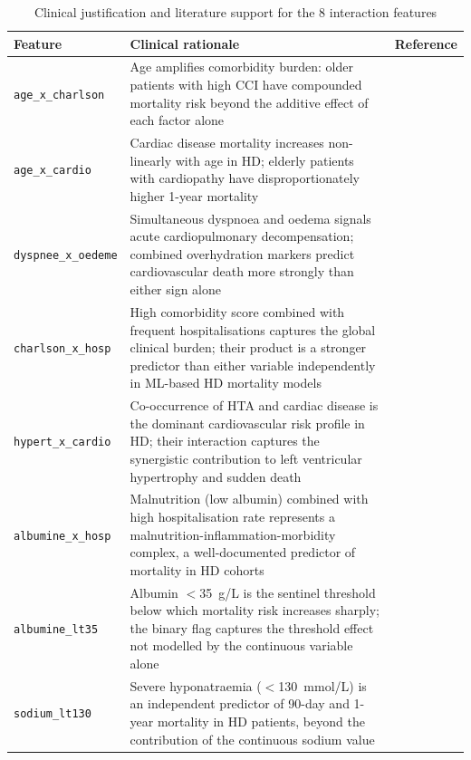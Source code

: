 \documentclass[12pt,a4paper,twoside]{report}
\begin{document}
\begin{table}[htbp]
\centering
\caption{Clinical justification and literature support for the 8 interaction features}
\label{tab:interaction_evidence}
\small\begin{tabularx}{\textwidth}{@{}p{3.6cm}p{5.8cm}p{3.6cm}@{}}
\toprule
\textbf{Feature} & \textbf{Clinical rationale} & \textbf{Reference} \\
\midrule

\texttt{age\_x\_charlson} &
  Age amplifies comorbidity burden: older patients with high CCI have compounded mortality risk beyond the additive effect of each factor alone &
  \cite{charlson1987, khan2008score} \\[4pt]

\texttt{age\_x\_cardio} &
  Cardiac disease mortality increases non-linearly with age in HD; elderly patients with cardiopathy have disproportionately higher 1-year mortality &
  \cite{foley1998cv, registre_rein_2022} \\[4pt]

\texttt{dyspnee\_x\_oedeme} &
  Simultaneous dyspnoea and oedema signals acute cardiopulmonary decompensation; combined overhydration markers predict cardiovascular death more strongly than either sign alone &
  \cite{wizemann2009} \\[4pt]

\texttt{charlson\_x\_hosp} &
  High comorbidity score combined with frequent hospitalisations captures the global clinical burden; their product is a stronger predictor than either variable independently in ML-based HD mortality models &
  \cite{sheng2020, charlson1987} \\[4pt]

\texttt{hypert\_x\_cardio} &
  Co-occurrence of HTA and cardiac disease is the dominant cardiovascular risk profile in HD; their interaction captures the synergistic contribution to left ventricular hypertrophy and sudden death &
  \cite{foley1998cv} \\[4pt]

\texttt{albumine\_x\_hosp} &
  Malnutrition (low albumin) combined with high hospitalisation rate represents a malnutrition-inflammation-morbidity complex, a well-documented predictor of mortality in HD cohorts &
  \cite{albumin_dialysis_2018, sheng2020} \\[4pt]

\texttt{albumine\_lt35} &
  Albumin $<$35~g/L is the sentinel threshold below which mortality risk increases sharply; the binary flag captures the threshold effect not modelled by the continuous variable alone &
  \cite{albumin_dialysis_2018} \\[4pt]

\texttt{sodium\_lt130} &
  Severe hyponatraemia ($<$130~mmol/L) is an independent predictor of 90-day and 1-year mortality in HD patients, beyond the contribution of the continuous sodium value &
  \cite{waikar2011sodium} \\[4pt]

\bottomrule
\end{tabularx}
\end{table}
\end{document}
